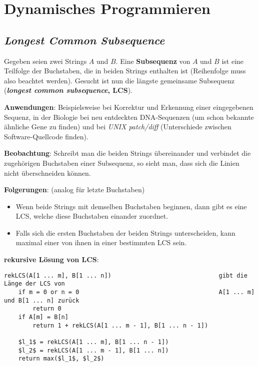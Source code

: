 \chapter{%
    Dynamisches Programmieren%
}

\section{%
    \emph{Longest Common Subsequence}%
}

Gegeben seien zwei Strings $A$ und $B$.
Eine \textbf{Subsequenz} von $A$ und $B$ ist eine Teilfolge der Buchstaben, die
in beiden Strings enthalten ist (Reihenfolge muss also beachtet werden).
Gesucht ist nun die längste gemeinsame Subsequenz
(\textbf{\emph{longest common subsequence}, LCS}).

\textbf{Anwendungen}:
Beispielsweise bei Korrektur und Erkennung einer eingegebenen Sequenz,
in der Biologie bei neu entdeckten DNA-Sequenzen (um schon bekannte ähnliche
Gene zu finden) und bei \emph{UNIX patch/diff}
(Unterschiede zwischen Software-Quellcode finden).

\linie

\textbf{Beobachtung}:
Schreibt man die beiden Strings übereinander und verbindet die zugehörigen
Buchstaben einer Subsequenz, so sieht man, dass sich die Linien nicht
überschneiden können.

\textbf{Folgerungen}:
(analog für letzte Buchstaben)
\begin{itemize}
    \item
    Wenn beide Strings mit demselben Buchstaben beginnen, dann gibt es eine
    LCS, welche diese Buchstaben einander zuordnet.

    \item
    Falls sich die ersten Buchstaben der beiden Strings unterscheiden,
    kann maximal einer von ihnen in einer bestimmten LCS sein.
\end{itemize}

\linie

\textbf{rekursive Lösung von LCS}:
\begin{lstlisting}
rekLCS(A[1 ... m], B[1 ... n])                              gibt die Länge der LCS von
    if m = 0 or n = 0                                       A[1 ... m] und B[1 ... n] zurück
        return 0
    if A[m] = B[n]
        return 1 + rekLCS(A[1 ... m - 1], B[1 ... n - 1])

    $l_1$ = rekLCS(A[1 ... m], B[1 ... n - 1])
    $l_2$ = rekLCS(A[1 ... m - 1], B[1 ... n])
    return max($l_1$, $l_2$)
\end{lstlisting}

